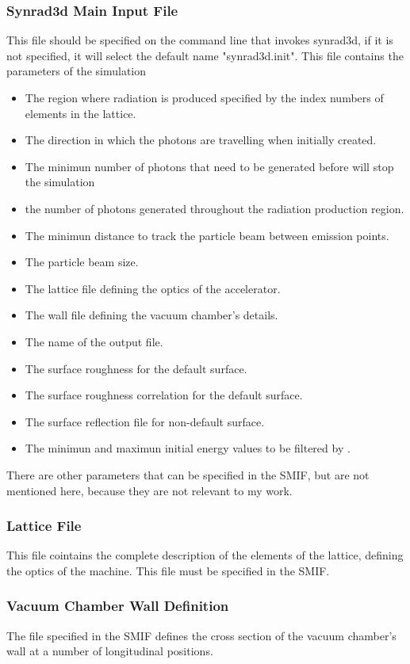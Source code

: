 \subsubsection*{Synrad3d Main Input File}
This file should be specified on the command line that invokes synrad3d, if it is not specified, it will select the default name "synrad3d.init". This file contains the parameters of the simulation
\begin{itemize}
\item The region where radiation is produced specified by the index numbers of elements in the lattice.
\item The direction in which the photons are travelling when initially created.
\item The minimun number of photons that need to be generated before \srthree will stop the simulation
\item the number of photons generated throughout the radiation production region.
\item The minimun distance to track the particle beam between emission points.
\item The particle beam size.
\item The lattice file defining the optics of the accelerator.
\item The wall file defining the vacuum chamber's details.
\item The name of the output file.
\item The surface roughness for the default surface.
\item The surface roughness correlation for the default surface.
\item The surface reflection file for non-default surface.
\item The minimun and maximun initial energy values to be filtered by \srthree .
\end{itemize}
There are other parameters that can be specified in the SMIF, but are not mentioned here, because they are not relevant to my work.

\subsubsection*{Lattice File}
This file cointains the complete description of the elements of the lattice, defining the optics of the machine. This file must be specified in the SMIF.
\subsubsection*{Vacuum Chamber Wall Definition}
The file specified in the SMIF defines the cross section of the vacuum chamber's wall at a number of longitudinal positions.
